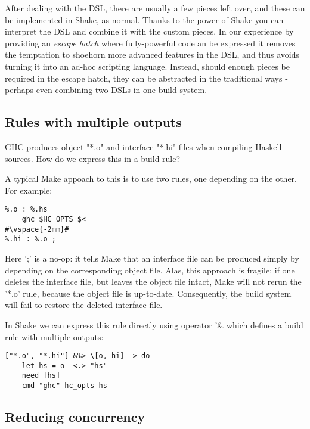After dealing with the DSL, there are usually a few pieces left over, and these
can be implemented in Shake, as normal. Thanks to the power of Shake you can
interpret the DSL and combine it with the custom pieces. In our experience by
providing an \emph{escape hatch} where fully-powerful code an be expressed it
removes the temptation to shoehorn more advanced features in the DSL, and thus
avoids turning it into an ad-hoc scripting language. Instead, should enough
pieces be required in the escape hatch, they can be abstracted in the
traditional ways - perhaps even combining two DSLs in one build system.

\subsection{Rules with multiple outputs\label{sec:multiple-outputs}}

GHC produces object \lst"*.o" and interface \lst"*.hi" files when compiling 
Haskell sources. How do we express this in a build rule?

A typical Make appoach to this is to use two rules, one depending on the other.
For example:

\begin{lstlisting}
%.o : %.hs
    ghc $HC_OPTS $<
#\vspace{-2mm}#
%.hi : %.o ;
\end{lstlisting}
\noindent Here \lst';' is a no-op: it tells Make that an interface file can be
produced simply by depending on the corresponding object file. Alas, this
approach is fragile: if one deletes the interface file, but leaves the object
file intact, Make will not rerun the \lst'*.o' rule, because the object file is
up-to-date. Consequently, the build system will fail to restore the deleted
interface file.

In Shake we can express this rule directly using operator \lst'&%
which defines a build rule with multiple outputs:


\begin{lstlisting}
["*.o", "*.hi"] &%> \[o, hi] -> do
    let hs = o -<.> "hs"
    need [hs]
    cmd "ghc" hc_opts hs
\end{lstlisting}

\subsection{Reducing concurrency\label{sec:ghc-pkg-db}}


